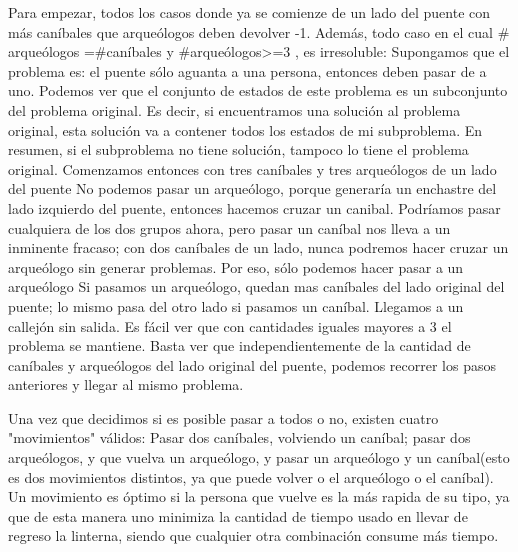 \documentclass[spanish,12pt]{article}
\begin{document}
Para empezar, todos los casos donde ya se comienze de un lado del puente con más caníbales que arqueólogos deben devolver -1. Además, todo caso en el cual $\#$arqueólogos =$\#$caníbales y $\#$arqueólogos>=3 , es irresoluble:
Supongamos que el problema es: el puente sólo aguanta a una persona, entonces deben pasar de a uno. Podemos ver que el conjunto de estados de este problema es un subconjunto del problema original. Es decir, si encuentramos una solución al problema original, esta solución va a contener todos los estados de mi subproblema. En resumen, si el subproblema no tiene solución, tampoco lo tiene el problema original.
Comenzamos entonces con tres caníbales y tres arqueólogos de un lado del puente
No podemos pasar un arqueólogo, porque generaría un enchastre del lado izquierdo del puente, entonces hacemos cruzar un canibal.
Podríamos pasar cualquiera de los dos grupos ahora, pero pasar un caníbal nos lleva a un inminente fracaso; con dos caníbales de un lado, nunca podremos hacer cruzar un arqueólogo sin generar problemas. Por eso, sólo podemos hacer pasar a un arqueólogo
Si pasamos un arqueólogo, quedan mas caníbales del lado original del puente; lo mismo pasa del otro lado si pasamos un caníbal. Llegamos a un callejón sin salida.
Es fácil ver que con cantidades iguales mayores a 3 el problema se mantiene. Basta ver que independientemente de la cantidad de caníbales y arqueólogos del lado original del puente, podemos recorrer los pasos anteriores y llegar al mismo problema.

Una vez que decidimos si es posible pasar a todos o no, existen cuatro "movimientos"  válidos: Pasar dos caníbales, volviendo un caníbal; pasar dos arqueólogos, y que vuelva un arqueólogo, y pasar un arqueólogo y un caníbal(esto es dos movimientos distintos, ya que puede volver o el arqueólogo o el caníbal). Un movimiento es óptimo si la persona que vuelve es la más rapida de su tipo, ya que de esta manera uno minimiza la cantidad de tiempo usado en llevar de regreso la linterna, siendo que cualquier otra combinación consume más tiempo.
\end{document}
